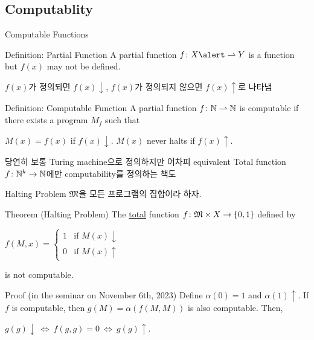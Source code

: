 \documentclass[../231120_msquare_computational-logic.tex]{subfiles}
\begin{document}
\subsection{Computablity}
\begin{frame}{Computable Functions}
    \begin{block}{Definition: Partial Function}
        A partial function \(f \colon X \alert\rightharpoonup Y\) is a function
        but \(f(x)\) may not be defined.
        \footnotesize
        \begin{itemize}
            \ii \(f(x)\)가 정의되면 \(f(x) \downarrow\),
            \ii \(f(x)\)가 정의되지 않으면 \(f(x) \uparrow\)로 나타냄
        \end{itemize}
    \end{block}
    \pause

    \begin{block}{Definition: Computable Function}
        A partial function \(f \colon \mathbb{N} \rightharpoonup \mathbb{N}\) is computable if
        there exists a  program \(M_f\) such that
        \begin{itemize}
            \ii \(M(x) = f(x)\) if \(f(x) \downarrow\).
            \ii \(M(x)\) never halts if \(f(x) \uparrow\).
        \end{itemize}
    \end{block}
    \begin{alertblock}{}
        \begin{itemize}
            \ii 당연히 보통 Turing machine으로 정의하지만 어차피 equivalent
            \ii \alert{Total} function \(f \colon \mathbb{N}^k \to \mathbb{N}\)에만 computability를 정의하는 책도
        \end{itemize}
    \end{alertblock}
\end{frame}

\begin{frame}{Halting Problem}
    \(\mathfrak{M}\)을 모든  프로그램의 집합이라 하자.
    \begin{block}{Theorem (Halting Problem)}
        The \ul{total} function \(f \colon \mathfrak{M} \times X \to \{0, 1\}\) defined by
        \centerline{\(f(M, x) = \begin{cases}
            1 & \text{if } M(x) \downarrow \\
            0 & \text{if } M(x) \uparrow
        \end{cases}\)}
        is not computable.
    \end{block}
    \begin{block}{Proof (in the seminar on November 6th, 2023)}
        Define \(\alpha(0) = 1\) and \(\alpha(1) \uparrow\).
        If \(f\) is computable, then \(g(M) = \alpha(f(M, M))\) is also computable.
        Then,
        \centerline{\(g(g)\downarrow \ \Leftrightarrow\ f(g, g) = 0 \ \Leftrightarrow\ g(g) \uparrow\).}
    \end{block}
\end{frame}
\end{document}
